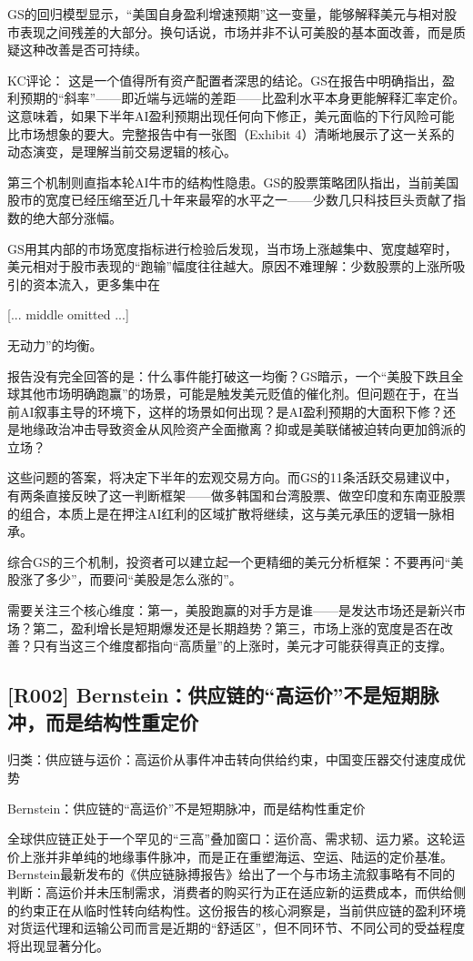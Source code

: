 \documentclass[11pt]{ctexart}
\begin{document}
GS的回归模型显示，“美国自身盈利增速预期”这一变量，能够解释美元与相对股市表现之间残差的大部分。换句话说，市场并非不认可美股的基本面改善，而是质疑这种改善是否可持续。

KC评论： 这是一个值得所有资产配置者深思的结论。GS在报告中明确指出，盈利预期的“斜率”——即近端与远端的差距——比盈利水平本身更能解释汇率定价。这意味着，如果下半年AI盈利预期出现任何向下修正，美元面临的下行风险可能比市场想象的要大。完整报告中有一张图（Exhibit 4）清晰地展示了这一关系的动态演变，是理解当前交易逻辑的核心。

第三个机制则直指本轮AI牛市的结构性隐患。GS的股票策略团队指出，当前美国股市的宽度已经压缩至近几十年来最窄的水平之一——少数几只科技巨头贡献了指数的绝大部分涨幅。

GS用其内部的市场宽度指标进行检验后发现，当市场上涨越集中、宽度越窄时，美元相对于股市表现的“跑输”幅度往往越大。原因不难理解：少数股票的上涨所吸引的资本流入，更多集中在

[... middle omitted ...]

无动力”的均衡。

报告没有完全回答的是：什么事件能打破这一均衡？GS暗示，一个“美股下跌且全球其他市场明确跑赢”的场景，可能是触发美元贬值的催化剂。但问题在于，在当前AI叙事主导的环境下，这样的场景如何出现？是AI盈利预期的大面积下修？还是地缘政治冲击导致资金从风险资产全面撤离？抑或是美联储被迫转向更加鸽派的立场？

这些问题的答案，将决定下半年的宏观交易方向。而GS的11条活跃交易建议中，有两条直接反映了这一判断框架——做多韩国和台湾股票、做空印度和东南亚股票的组合，本质上是在押注AI红利的区域扩散将继续，这与美元承压的逻辑一脉相承。

综合GS的三个机制，投资者可以建立起一个更精细的美元分析框架：不要再问“美股涨了多少”，而要问“美股是怎么涨的”。

需要关注三个核心维度：第一，美股跑赢的对手方是谁——是发达市场还是新兴市场？第二，盈利增长是短期爆发还是长期趋势？第三，市场上涨的宽度是否在改善？只有当这三个维度都指向“高质量”的上涨时，美元才可能获得真正的支撑。

\subsection{[R002] Bernstein：供应链的“高运价”不是短期脉冲，而是结构性重定价}
{\small\color{refgray}归类：供应链与运价：高运价从事件冲击转向供给约束，中国变压器交付速度成优势}

Bernstein：供应链的“高运价”不是短期脉冲，而是结构性重定价

全球供应链正处于一个罕见的“三高”叠加窗口：运价高、需求韧、运力紧。这轮运价上涨并非单纯的地缘事件脉冲，而是正在重塑海运、空运、陆运的定价基准。Bernstein最新发布的《供应链脉搏报告》给出了一个与市场主流叙事略有不同的判断：高运价并未压制需求，消费者的购买行为正在适应新的运费成本，而供给侧的约束正在从临时性转向结构性。这份报告的核心洞察是，当前供应链的盈利环境对货运代理和运输公司而言是近期的“舒适区”，但不同环节、不同公司的受益程度将出现显著分化。
\end{document}
